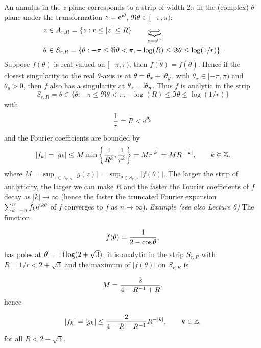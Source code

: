 \documentclass[12pt,landscape]{article}
\def\I{ {\rm i} }
\def\E{ {\rm e} }
\begin{document}
{An annulus in the $z$-plane corresponds to a strip of width $2\pi$ in the (complex) $\theta$-plane under the transformation $z = \E^{\I \theta}$, $\Re \theta \in [-\pi, \pi)$:
\begin{align*}
& z \in A_{r,R} = \lbrace z : r \leq \vert z \vert \leq R \rbrace \qquad \underbrace{\Longleftrightarrow}_{z = \E^{\I \theta}} \\
& \theta \in  S_{r,R} =   \lbrace \theta : -\pi \leq \Re  \theta < \pi,  -\log(R) \leq \Im \theta \leq \log(1/r) \rbrace.
\end{align*}
\newpage
Suppose $f(\theta)$ is real-valued on $[-\pi, \pi)$, then $\overline{f(\theta)} = f(\overline{\theta})$. Hence if the closest singularity to the real $\theta$-axis is at $\theta = \theta_x + \I \theta_y$, with $\theta_x \in [-\pi, \pi)$ and $\theta_y > 0$, then $f$ also has a singularity at  $\theta_x - \I \theta_y$. Thus $f$ is analytic in the strip
\[
S_{r,R} = \theta \in    \lbrace \theta : -\pi \leq \Re  \theta < \pi,  -\log(R) \leq \Im \theta \leq \log(1/r) \rbrace
\]
with
\[
{1 \over r} = R < \E^{\theta_y}
\]
and the Fourier coefficients are bounded by
\[
|f_k | = |g_k |  \leq M\min\left\{{1 \over R^k} , {1 \over r^k}\right\} = M r^{|k|} = M R^{-|k|}, \qquad k \in \mathbb{Z},
\]
where $M = \sup_{z \in  A_{r,R}} |g(z)| = \sup_{\theta \in  S_{r,R}} |f(\theta)|$. The larger the strip of analyticity, the larger we can make $R$ and the faster the Fourier coefficients of $f$ decay as $\vert k \vert \to \infty$  (hence the faster the truncated Fourier expansion $\sum_{k=-n}^{n}\hat f_k \E^{i k \theta}$ of $f$ converges to $f$ as $n \to \infty$).
\newpage
\emph{Example (see also Lecture 6)} The function

\[
 f(\theta) = {1 \over 2 - \cos\theta},
\]
has poles at $\theta = \pm \I \log (2 + \sqrt{3})$; it is analytic in the strip $S_{r,R}$ with $R = 1/r < 2 + \sqrt{3}$ and the maximum of $\vert f(\theta) \vert$ on $S_{r,R}$ is

\[
M = {2 \over 4 - R^{-1} + R},
\]
hence

\[
|f_k| =     |g_k| \leq {2 \over 4 - R -R^{-1}} R^{-\vert k \vert}, \qquad k \in \mathbb{Z},
\]
for all $R < 2 + \sqrt{3}$.


}
\end{document}
